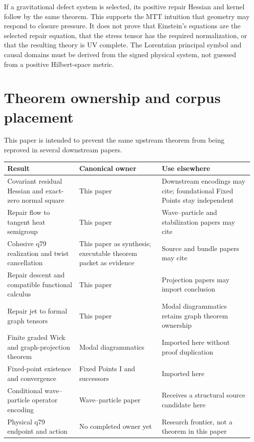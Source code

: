 \documentclass[11pt,a4paper]{article}
\begin{document}
If a gravitational defect system is selected, its positive repair Hessian
and kernel follow by the same theorem.  This supports the MTT intuition that
geometry may respond to closure pressure.  It does not prove that Einstein's
equations are the selected repair equation, that the stress tensor has the
required normalization, or that the resulting theory is UV complete.  The
Lorentzian principal symbol and causal domains must be derived from the
signed physical system, not guessed from a positive Hilbert-space metric.

\section{Theorem ownership and corpus placement}
\label{sec:ownership}

This paper is intended to prevent the same upstream theorem from being
reproved in several downstream papers.

\begin{center}
\small
\begin{tabular}{>{\raggedright\arraybackslash}p{}
                >{\raggedright\arraybackslash}p{}
                >{\raggedright\arraybackslash}p{}}
\toprule
Result & Canonical owner & Use elsewhere\\
\midrule
Covariant residual Hessian and exact-zero normal square & This paper &
Downstream encodings may cite; foundational Fixed Points stay independent\\
Repair flow to tangent heat semigroup & This paper &
Wave--particle and stabilization papers may cite\\
Cohesive q79 realization and twist cancellation & This paper as synthesis;
executable theorem packet as evidence &
Source and bundle papers may cite\\
Repair descent and compatible functional calculus & This paper &
Projection papers may import conclusion\\
Repair jet to formal graph tensors & This paper &
Modal diagrammatics retains graph theorem ownership\\
Finite graded Wick and graph-projection theorem & Modal diagrammatics &
Imported here without proof duplication\\
Fixed-point existence and convergence & Fixed Points I and successors &
Imported here\\
Conditional wave--particle operator encoding & Wave--particle paper &
Receives a structural source candidate here\\
Physical q79 endpoint and action & No completed owner yet &
Research frontier, not a theorem in this paper\\
\bottomrule
\end{tabular}
\end{center}
\end{document}
